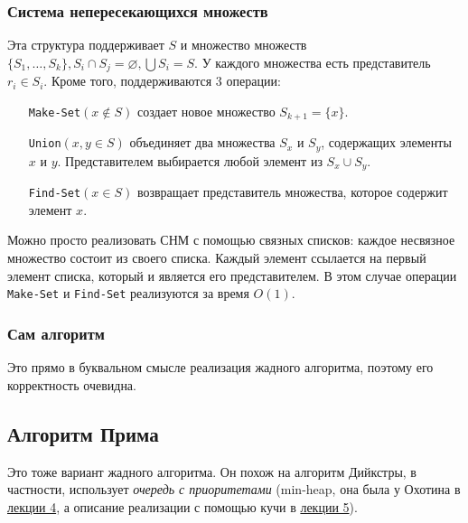 \subsubsection{Система непересекающихся множеств}
Эта структура поддерживает $S$ и множество множеств $\{S_1,\ldots,S_k\},S_i\cap S_j=\varnothing,\bigcup S_i=S$. У каждого множества есть представитель $r_i\in S_i$. Кроме того, поддерживаются 3 операции:
\begin{itemize}
	\item[{\tt Make-Set}$(x\not\in S)$] создает новое множество $S_{k+1}=\{x\}$.
	\item[{\tt Union}$(x,y\in S)$] объединяет два множества $S_x$ и $S_y$, содержащих элементы $x$ и $y$. Представителем выбирается любой элемент из $S_x\cup S_y$.
	\item[{\tt Find-Set}$(x\in S)$] возвращает представитель множества, которое содержит элемент $x$.
\end{itemize}
Можно просто реализовать СНМ с помощью связных списков: каждое несвязное множество состоит из своего списка. Каждый элемент ссылается на первый элемент списка, который и является его представителем. В этом случае операции {\tt Make-Set} и {\tt Find-Set} реализуются за время $O(1)$.
\subsubsection{Сам алгоритм}
\begin{algorithm}
	\DontPrintSemicolon
\end{algorithm}
Это прямо в буквальном смысле реализация жадного алгоритма, поэтому его корректность очевидна.
\subsection{Алгоритм Прима}
Это тоже вариант жадного алгоритма. Он похож на алгоритм Дийкстры, в частности, использует {\it очередь с приоритетами} (min-heap, она была у Охотина в  \href{https://users.math-cs.spbu.ru/~okhotin/teaching/algorithms_2019/okhotin_algorithms_2019_l4.pdf}{лекции 4}, а описание реализации с помощью кучи в \href{https://users.math-cs.spbu.ru/~okhotin/teaching/algorithms_2019/okhotin_algorithms_2019_l5.pdf}{лекции 5}).

